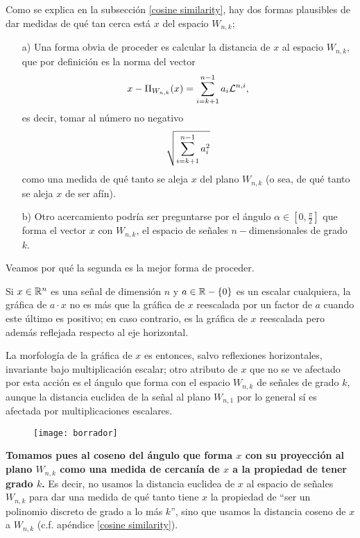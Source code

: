 Como se explica en la subsección \ref{cosine similarity}, hay
dos formas plausibles de dar medidas de qué tan cerca está
$x$ del espacio $W_{n,k}$;

\begin{itemize}
\item[a)] Una forma obvia de proceder es calcular
la distancia de $x$ al espacio $W_{n,k}$, que por definición es 
la norma
del vector 
\[
x - \Pi_{W_{n,k}}(x)= \sum\limits_{i=k+1}^{n-1}a_{i} \mathcal{L}^{n, i},
\]
es decir, tomar al número no negativo
\[
\sqrt{ \sum\limits_{i=k+1}^{n-1}a_{i}^{2}}
\]
como una medida de qué tanto se aleja $x$ del plano $W_{n,k}$
(o sea, de qué tanto se aleja $x$ de ser afín).

\item[b)] Otro acercamiento podría ser preguntarse por
el ángulo $\alpha \in [0, \frac{\pi}{2}]$ 
que forma el vector $x$ con
$W_{n,k}$, el espacio de señales $n-$dimensionales de grado $k$.
\end{itemize}
Veamos por qué la segunda
es la mejor forma de proceder.

Si $x \in \mathbb{R}^{n}$ es una señal de dimensión $n$ y 
$a \in \mathbb{R}-\{ 0 \}$ es un escalar cualquiera,
la gráfica de $a \cdot x$ no es más que la gráfica 
de $x$ reescalada por un factor de $a$ cuando este
último es positivo; en caso contrario, es la gráfica
de $x$ reescalada pero además reflejada respecto al eje
horizontal.

La morfología de la gráfica de $x$ es entonces,
salvo reflexiones horizontales, invariante bajo multiplicación
escalar; otro atributo de $x$ que no se ve afectado por esta acción
es el ángulo que forma con el espacio $W_{n,k}$ de señales de grado $k$,
aunque la distancia euclidea de la señal
al plano $W_{n,1}$ por lo general sí es afectada por multiplicaciones escalares.


\begin{figure}[H]
	\centering
	\texttt{[image: borrador]}
\end{figure}

\textbf{Tomamos pues al coseno del ángulo que forma $x$ con su proyección
al plano $W_{n,k}$ como una medida de cercanía de $x$ a la propiedad de 
tener grado $k$.} 
Es decir, no usamos la distancia euclidea de 
$x$ al espacio de señales $W_{n,k}$ para dar una medida
de qué tanto tiene $x$ la propiedad de ``ser un polinomio
discreto de grado a lo más $k$'', sino que 
usamos la distancia coseno de $x$ a $W_{n,k}$
(c.f. apéndice \ref{cosine similarity}). \\

